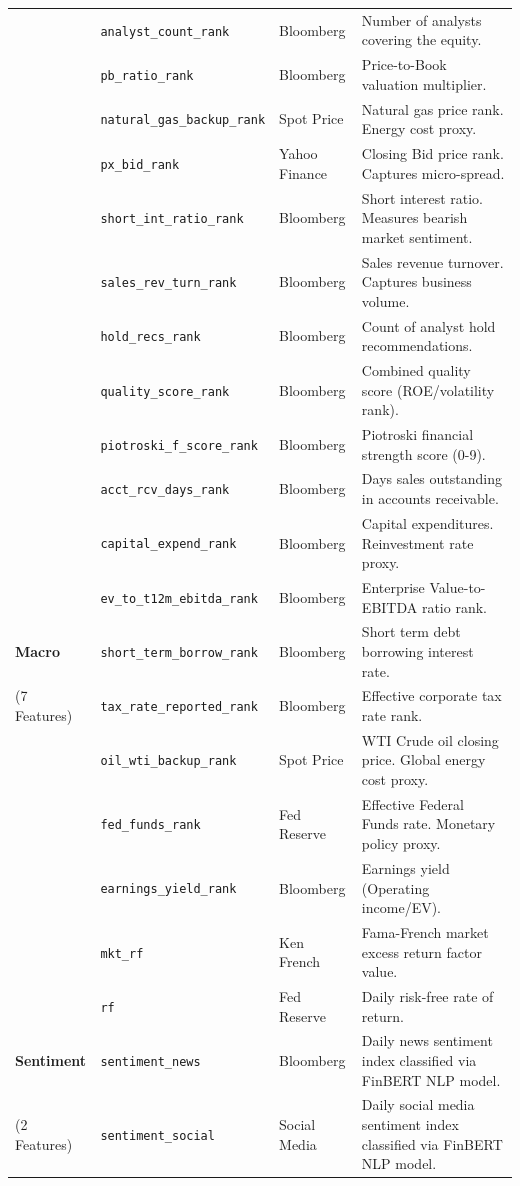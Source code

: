 \documentclass[11pt]{article}
\begin{document}
\begin{longtable}{p{3.0cm} p{4.5cm} p{2.2cm} p{6.0cm}}
    & \texttt{analyst\_count\_rank} & Bloomberg & Number of analysts covering the equity. \\
    & \texttt{pb\_ratio\_rank} & Bloomberg & Price-to-Book valuation multiplier. \\
    & \texttt{natural\_gas\_backup\_rank} & Spot Price & Natural gas price rank. Energy cost proxy. \\
    & \texttt{px\_bid\_rank} & Yahoo Finance & Closing Bid price rank. Captures micro-spread. \\
    & \texttt{short\_int\_ratio\_rank} & Bloomberg & Short interest ratio. Measures bearish market sentiment. \\
    & \texttt{sales\_rev\_turn\_rank} & Bloomberg & Sales revenue turnover. Captures business volume. \\
    & \texttt{hold\_recs\_rank} & Bloomberg & Count of analyst hold recommendations. \\
    & \texttt{quality\_score\_rank} & Bloomberg & Combined quality score (ROE/volatility rank). \\
    & \texttt{piotroski\_f\_score\_rank} & Bloomberg & Piotroski financial strength score (0-9). \\
    & \texttt{acct\_rcv\_days\_rank} & Bloomberg & Days sales outstanding in accounts receivable. \\
    & \texttt{capital\_expend\_rank} & Bloomberg & Capital expenditures. Reinvestment rate proxy. \\
    & \texttt{ev\_to\_t12m\_ebitda\_rank} & Bloomberg & Enterprise Value-to-EBITDA ratio rank. \\
    \midrule
    \textbf{Macro} & \texttt{short\_term\_borrow\_rank} & Bloomberg & Short term debt borrowing interest rate. \\
    (7 Features) & \texttt{tax\_rate\_reported\_rank} & Bloomberg & Effective corporate tax rate rank. \\
    & \texttt{oil\_wti\_backup\_rank} & Spot Price & WTI Crude oil closing price. Global energy cost proxy. \\
    & \texttt{fed\_funds\_rank} & Fed Reserve & Effective Federal Funds rate. Monetary policy proxy. \\
    & \texttt{earnings\_yield\_rank} & Bloomberg & Earnings yield (Operating income/EV). \\
    & \texttt{mkt\_rf} & Ken French & Fama-French market excess return factor value. \\
    & \texttt{rf} & Fed Reserve & Daily risk-free rate of return. \\
    \midrule
    \textbf{Sentiment} & \texttt{sentiment\_news} & Bloomberg & Daily news sentiment index classified via FinBERT NLP model. \\
    (2 Features) & \texttt{sentiment\_social} & Social Media & Daily social media sentiment index classified via FinBERT NLP model. \\
\end{longtable}
\end{document}

